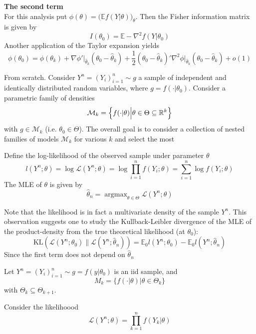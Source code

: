 \documentclass[a4paper]{article}
\newcommand{\Real}{\mathbb{R}}
\newcommand{\Mcal}{\mathcal{M}}
\newcommand{\Lcal}{\mathcal{L}}
\newcommand{\ex}{\mathbb{E}}
\newcommand{\argmax}{\mathop{\text{argmax}}}
\begin{document}
\noindent \textbf{The second term}\hfill\\
For this analysis put $\phi(\theta) = \bigl( \ex f(Y|\theta) \bigr)_{\theta}$.
Then the Fisher information matrix is given by 
\[I(\theta_0) = \ex - \nabla^2 f(Y|\theta_0)\]
Another application of the Taylor expansion yields
\[
  \phi(\theta_0)
= \phi(\theta_k)
+ \nabla \phi' \rvert_{\hat{\theta}_k} (\theta_0 - \hat{\theta}_k)
+ \frac{1}{2} (\theta_0 - \hat{\theta}_k)' \nabla^2\phi \rvert_{\hat{\theta}_k} (\theta_0 - \hat{\theta}_k)
+ o(1)
\]

From scratch. Consider $Y^n = (Y_i)_{i=1}^n \sim g$ a sample of independent and
identically distributed random variables, where $g = f(\cdot|\theta_0)$. Consider
a parametric family of densities
\[\Mcal_k = \Bigl\{ f(\cdot|\theta)\Bigr.\Bigl\rvert \theta\in \Theta\subseteq \Real^k \Bigr\}\]
with $g\in \Mcal_k$ (i.e. $\theta_0\in\Theta$). The overall goal is to consider
a collection of nested families of models $\Mcal_k$ for various $k$ and select
the most 

Define the log-likelihood of the observed sample under parameter $\theta$
\[
l(Y^n;\theta)
= \log \Lcal(Y^n;\theta)
= \log \prod_{i=1}^n f(Y_i;\theta)
= \sum_{i=1}^n \log f(Y_i; \theta)
\]
The MLE of $\theta$ is given by
\[\hat{\theta}_n = \argmax_{\theta\in \Theta} \Lcal(Y^n;\theta)\]

Note that the likelihood is in fact a multivariate density of the sample $Y^n$.
This observation suggests one to study the Kullback-Leibler divergence of the MLE
of the product-density from the true theoretical likelihood (at $\theta_0$):
\[
\text{KL}( \Lcal(Y^n;\theta_0) \| \Lcal(Y^n;\hat{\theta}_n) )
= \ex_0 l(Y^n;\theta_0) - \ex_0 l(Y^n;\hat{\theta}_n)
\]
Since the first term does not depend on $\hat{\theta}_n$



Let $Y^n = (Y_i)_{i=1}^n\sim g = f(y|\theta_0)$ is an iid sample, and 
\[
M_k = \bigl\{f(\cdot|\theta)\rvert \theta\in \Theta_k\bigr\}
\]
with $\Theta_k \subseteq \Theta_{k+1}$.

Consider the likelihoood 
\[\Lcal(Y^n;\theta) = \prod_{k=1}^n f(Y_k\rvert \theta) \]
\end{document}
